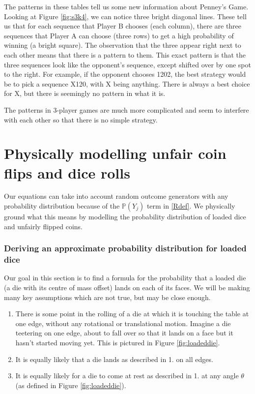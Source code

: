 \documentclass[english,12pt,a4paper,final]{article}
\begin{document}
The patterns in these tables tell us some new information about Penney's Game. Looking at Figure \ref{fig:s3k4}, we can notice three bright diagonal lines. These tell us that for each sequence that Player B chooses (each column), there are three sequences that Player A can choose (three rows) to get a high probability of winning (a bright square). The observation that the three appear right next to each other means that there is a pattern to them. This exact pattern is that the three sequences look like the opponent's sequence, except shifted over by one spot to the right. For example, if the opponent chooses 1202, the best strategy would be to pick a sequence X120, with X being anything. There is always a best choice for X, but there is seemingly no pattern in what it is.

The patterns in 3-player games are much more complicated and seem to interfere with each other so that there is no simple strategy.

\part {Physically modelling unfair coin flips and dice rolls \label{physicalModelling}}

Our equations can take into account random outcome generators with any probability distribution because of the $\mathbb{P}(Y_j)$ term in \eqref{Rdef}. We physically ground what this means by modelling the probability distribution of loaded dice and unfairly flipped coins.

\section{Deriving an approximate probability distribution for loaded dice}

Our goal in this section is to find a formula for the probability that a loaded die (a die with its centre of mass offset) lands on each of its faces. We will be making many key assumptions which are not true, but may be close enough.

\begin{enumerate}
	\item There is some point in the rolling of a die at which it is touching the table at one edge, without any rotational or translational motion. Imagine a die teetering on one edge, about to fall over so that it lands on a face but it hasn't started moving yet. This is pictured in Figure \ref{fig:loadeddie}.
	\item It is equally likely that a die lands as described in 1. on all edges.
	\item It is equally likely for a die to come at rest as described in 1. at any angle $\theta$ (as defined in Figure \ref{fig:loadeddie}).
\end{enumerate}
\end{document}
